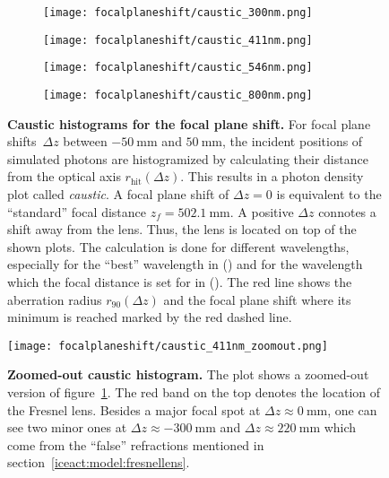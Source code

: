 \begin{figure}[H]
	\centering
	\begin{subfigure}[t]{0.48\textwidth}
		\centering
		\texttt{[image: focalplaneshift/caustic\_300nm.png]}
	\end{subfigure}
	\hfill
	\begin{subfigure}[t]{0.48\textwidth}
		\centering
		\texttt{[image: focalplaneshift/caustic\_411nm.png]}
		\label{focalplaneshift_bestwvl}
	\end{subfigure}
	\hfill
	\begin{subfigure}[t]{0.48\textwidth}
		\centering
		\texttt{[image: focalplaneshift/caustic\_546nm.png]}
		\label{focalplaneshift_famouswvl}
	\end{subfigure}
	\hfill
	\begin{subfigure}[t]{0.48\textwidth}
		\centering
		\texttt{[image: focalplaneshift/caustic\_800nm.png]}
	\end{subfigure}
	\caption[Caustic histograms for the focal plane shift]{\textbf{Caustic histograms for the focal plane shift.} For focal plane shifts~$\Delta z$ between $\SI{-50}{\milli\meter}$ and $\SI{50}{\milli\meter}$, the incident positions of simulated photons are histogramized by calculating their distance from the optical axis $r_\text{hit}(\Delta z)$. This results in a photon density plot called \textit{caustic}. A focal plane shift of $\Delta z = 0$ is equivalent to the \enquote{standard} focal distance $z_f=\SI{502.1}{\milli\meter}$. A positive $\Delta z$ connotes a shift away from the lens. Thus, the lens is located on top of the shown plots. The calculation is done for different wavelengths, especially for the \enquote{best} wavelength in () and for the wavelength which the focal distance is set for in (). The red line shows the aberration radius $r_{90}(\Delta z)$ and the focal plane shift where its minimum is reached marked by the red dashed line.}
	\label{focalplaneshift}
\end{figure}

\begin{figure}[H]
	\centering
	\texttt{[image: focalplaneshift/caustic\_411nm\_zoomout.png]}
	\caption[Zoomed-out caustic histogram]{\textbf{Zoomed-out caustic histogram.} The plot shows a zoomed-out version of figure~\ref{focalplaneshift_bestwvl}. The red band on the top denotes the location of the Fresnel lens. Besides a major focal spot at $\Delta z\approx\SI{0}{\milli\meter}$, one can see two minor ones at $\Delta z\approx\SI{-300}{\milli\meter}$ and $\Delta z\approx\SI{220}{\milli\meter}$ which come from the \enquote{false} refractions mentioned in section~\ref{iceact:model:fresnellens}.}
	\label{focalplaneshift_zoomout}
\end{figure}

